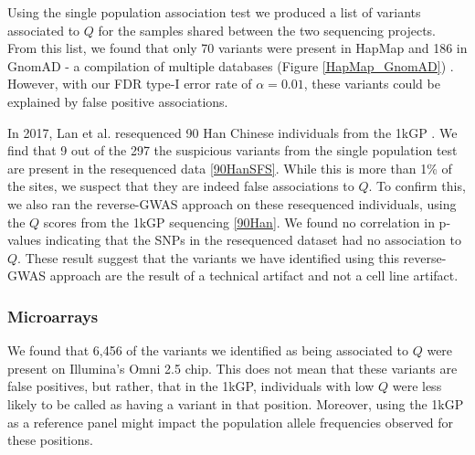 \documentclass[9pt,lineno]{elife}
\newcommand{\sgcomment}[1]{\textcolor{blue}{SG: #1}}
\begin{document}
Using the single population association test we produced a list of variants associated to $Q$ for the samples shared between the two sequencing projects.
From this list, we found that only 70 variants were present in HapMap and 186 in GnomAD - a compilation of multiple databases (Figure \ref{HapMap_GnomAD}) \citep{HapMap2005,Lek2016}.
However, with our FDR type-I error rate of $\alpha = 0.01$, these variants could be explained by false positive associations.


In 2017, Lan et al. resequenced 90 Han Chinese individuals from the 1kGP \citep{Lan2017}. 
We find that 9 out of the 297 the suspicious variants from the single population test are present in the resequenced data \ref{90HanSFS}.
While this is more than 1\% of the sites, we suspect that they are indeed false associations to $Q$.
To confirm this, we also ran the reverse-GWAS approach on these resequenced individuals, using the $Q$ scores from the 1kGP sequencing \ref{90Han}.
We found no correlation in p-values indicating that the SNPs in the resequenced dataset had no association to $Q$.
These result suggest that the variants we have identified using this reverse-GWAS approach are the result of a technical artifact and not a cell line artifact.

\subsubsection{Microarrays}
We found that 6,456 of the variants we identified as being associated to $Q$ were present on Illumina's Omni 2.5 chip. This does not mean that these variants are false positives, but rather, that in the 1kGP, individuals with low $Q$ were less likely to be called as having a variant in that position. Moreover, using the 1kGP as a reference panel might impact the population allele frequencies observed for these positions.
\end{document}
